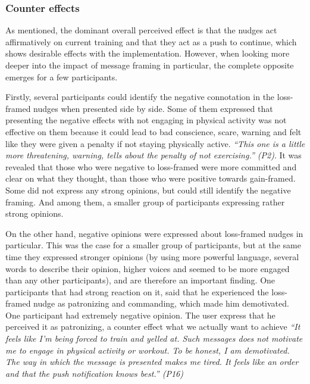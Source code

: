 \subsubsection{Counter effects}
As mentioned, the dominant overall perceived effect is that the nudges act affirmatively on current training and that they act as a push to continue, which shows desirable effects with the implementation. However, when looking more deeper into the impact of message framing in particular, the complete opposite emerges for a few participants. 

Firstly, several participants could identify the negative connotation in the loss-framed nudges when presented side by side. Some of them expressed that presenting the negative effects with not engaging in physical activity was not effective on them because it could lead to bad conscience, scare, warning and felt like they were given a penalty if not staying physically active. \textit{“This one is a little more threatening, warning, tells about the penalty of not exercising.” (P2)}. It was revealed that those who were negative to loss-framed were more committed and clear on what they thought, than those who were positive towards gain-framed. Some did not express any strong opinions, but could still identify the negative framing. And among them, a smaller group of participants expressing rather strong opinions.

On the other hand, negative opinions were expressed about loss-framed nudges in particular. This was the case for a smaller group of participants, but at the same time they expressed stronger opinions (by using more powerful language, several words to describe their opinion, higher voices and seemed to be more engaged than any other participants), and are therefore an important finding. One participants that had strong reaction on it, said that he experienced the loss-framed nudge as patronizing and commanding, which made him demotivated. One participant had extremely negative opinion. The user express that he perceived it as patronizing, a counter effect what we actually want to achieve
\textit{“It feels like I'm being forced to train and yelled at. Such messages does not motivate me to engage in physical activity or workout. To be honest, I am demotivated. The way in which the message is presented makes me tired. It feels like an order and that the push notification knows best.” (P16)}


